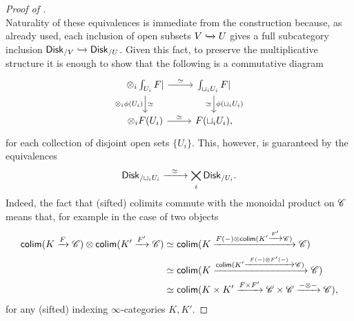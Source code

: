 \documentclass[../text.tex]{subfiles}
\begin{document}
\begin{proof}[Proof of {}]
\begin{equation}
    \end{equation}
    Naturality of these equivalences is immediate from the construction because, as already used, each inclusion of open subsets $V \xhookrightarrow{} U$ gives a full subcategory inclusion $\disk[r]_{/V} \xhookrightarrow{} \disk[r]_{/U}$. Given this fact, to preserve the multiplicative structure it is enough to show that the following is a commutative diagram
    \begin{equation}\label{eq:mult_strut_comm_square}
        \begin{tikzcd}
            \otimes_i \int_{U_i} F| \arrow[r, "\simeq"] \arrow[d, "\otimes_i \phi (U_i)"', "\simeq"] & \int_{\sqcup_i U_i} F| \arrow[d, "\phi (\sqcup_i U_i)", "\simeq"']\\
            \otimes_i F (U_i) \arrow[r, "\simeq"] & F (\sqcup_i U_i),
        \end{tikzcd}
    \end{equation}
    for each collection of disjoint open sets $\{U_i\}$. This, however, is guaranteed by the equivalences
    \begin{equation}
        \disk[r]_{/\sqcup_i U_i} \xrightarrow{\ \ \simeq \ \ } \bigtimes_i \disk[r]_{/U_i}.
    \end{equation}
    Indeed, the fact that (sifted) colimits commute with the monoidal product on $\mathscr{C}$ means that, for example in the case of two objects
    \begin{align}
        \mathsf{colim}(K \xrightarrow{F} \mathscr{C}) \otimes \mathsf{colim}(K' \xrightarrow{F'} \mathscr{C}) &\simeq \mathsf{colim}(K \xrightarrow{F(-) \otimes \mathsf{colim}(K' \xrightarrow{F'} \mathscr{C})} \mathscr{C})\notag\\
        &\simeq \mathsf{colim}(K \xrightarrow{\mathsf{colim}(K' \xrightarrow{F(-) \otimes F'(-)} \mathscr{C})} \mathscr{C})\notag\\
        &\simeq \mathsf{colim}(K \times K' \xrightarrow{F \times F'} \mathscr{C} \times \mathscr{C} \xrightarrow{- \otimes -} \mathscr{C}),
    \end{align}
    for any (sifted) indexing $\infty$-categories $K, K'$.


\end{proof}
\end{document}
